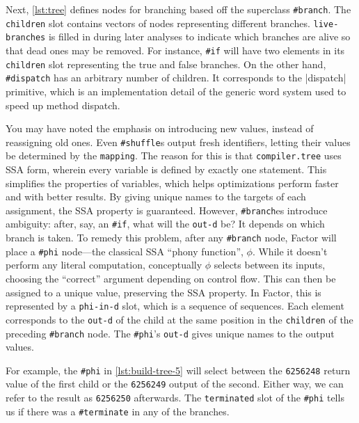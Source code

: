 Next, \vref{lst:tree} defines nodes for branching based off the superclass
\Verb|#branch|.  The \Verb|children| slot contains vectors of nodes
representing different branches.  \Verb|live-branches| is filled in during
later analyses to indicate which branches are alive so that dead ones may be
removed.  For instance, \Verb|#if| will have two elements in its
\Verb|children| slot representing the true and false branches.  On the other
hand, \Verb|#dispatch| has an arbitrary number of children.  It corresponds
to the \factor|dispatch| primitive, which is an implementation detail of the
generic word system used to speed up method dispatch.

You may have noted the emphasis on introducing new values, instead of
reassigning old ones.  Even \Verb|#shuffle|s output fresh identifiers,
letting their values be determined by the \Verb|mapping|.  The reason for
this is that \Verb|compiler.tree| uses \gls{SSA} form, wherein every variable
is defined by exactly one statement.  This simplifies the properties of
variables, which helps optimizations perform faster and with better
results.  By giving unique names to the targets of each assignment,
the \gls{SSA} property is guaranteed.  However, \Verb|#branch|es introduce
ambiguity: after, say, an \Verb|#if|, what will the \Verb|out-d| be?  It
depends on which branch is taken.  To remedy this problem, after any
\Verb|#branch| node, Factor will place a \Verb|#phi| node---the classical
\gls{SSA} ``phony function'', $\phi$.  While it doesn't perform any literal
computation, conceptually $\phi$ selects between its inputs, choosing the
``correct'' argument depending on control flow.  This can then be assigned to a
unique value, preserving the \gls{SSA} property.  In Factor, this is
represented by a \Verb|phi-in-d| slot, which is a sequence of sequences.
Each element corresponds to the \Verb|out-d| of the child at the same
position in the \Verb|children| of the preceding \Verb|#branch| node.  The
\Verb|#phi|'s \Verb|out-d| gives unique names to the output values.


For example, the \Verb|#phi| in \vref{lst:build-tree-5} will select between
the \Verb|6256248| return value of the first child or the \Verb|6256249|
output of the second.  Either way, we can refer to the result as
\Verb|6256250| afterwards.  The \Verb|terminated| slot of the \Verb|#phi|
tells us if there was a \Verb|#terminate| in any of the branches.

